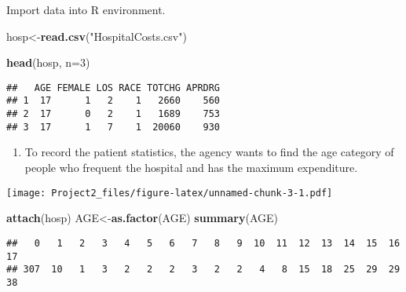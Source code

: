 \documentclass[
]{article}
\author{}
\date{\vspace{-2.5em}}
\newenvironment{Shaded}{\begin{snugshade}}{\end{snugshade}}
\newcommand{\DataTypeTok}[1]{\textcolor[rgb]{0.13,0.29,0.53}{#1}}
\newcommand{\DecValTok}[1]{\textcolor[rgb]{0.00,0.00,0.81}{#1}}
\newcommand{\KeywordTok}[1]{\textcolor[rgb]{0.13,0.29,0.53}{\textbf{#1}}}
\newcommand{\NormalTok}[1]{#1}
\newcommand{\OperatorTok}[1]{\textcolor[rgb]{0.81,0.36,0.00}{\textbf{#1}}}
\newcommand{\StringTok}[1]{\textcolor[rgb]{0.31,0.60,0.02}{#1}}
\providecommand{\tightlist}{%
  \setlength{\itemsep}{0pt}\setlength{\parskip}{0pt}}
\begin{document}
Import data into R environment.

\begin{Shaded}
\begin{Highlighting}[]
\NormalTok{hosp<-}\KeywordTok{read.csv}\NormalTok{(}\StringTok{"HospitalCosts.csv"}\NormalTok{) }
\end{Highlighting}
\end{Shaded}

\begin{Shaded}
\begin{Highlighting}[]
\KeywordTok{head}\NormalTok{(hosp, }\DataTypeTok{n=}\DecValTok{3}\NormalTok{)}
\end{Highlighting}
\end{Shaded}

\begin{verbatim}
##   AGE FEMALE LOS RACE TOTCHG APRDRG
## 1  17      1   2    1   2660    560
## 2  17      0   2    1   1689    753
## 3  17      1   7    1  20060    930
\end{verbatim}

\begin{enumerate}
\def\labelenumi{\arabic{enumi}.}
\tightlist
\item
  To record the patient statistics, the agency wants to find the age
  category of people who frequent the hospital and has the maximum
  expenditure.
\end{enumerate}

\begin{Shaded}
\end{Shaded}

\texttt{[image: Project2\_files/figure-latex/unnamed-chunk-3-1.pdf]}

\begin{Shaded}
\begin{Highlighting}[]
\KeywordTok{attach}\NormalTok{(hosp) }
\NormalTok{AGE<-}\KeywordTok{as.factor}\NormalTok{(AGE) }
\KeywordTok{summary}\NormalTok{(AGE)}
\end{Highlighting}
\end{Shaded}

\begin{verbatim}
##   0   1   2   3   4   5   6   7   8   9  10  11  12  13  14  15  16  17 
## 307  10   1   3   2   2   2   3   2   2   4   8  15  18  25  29  29  38
\end{verbatim}
\end{document}
